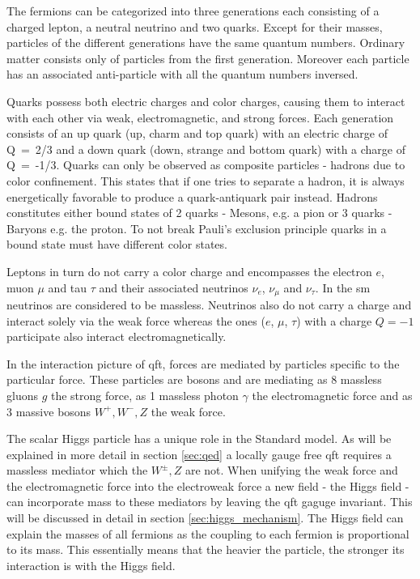 The fermions can be categorized into three generations each consisting of a charged lepton, a neutral neutrino and two quarks. Except for their masses, particles of the different generations have the same quantum numbers. Ordinary matter consists only of particles from the first generation. Moreover each particle has an associated anti-particle with all the quantum numbers inversed.

Quarks possess both electric charges and color charges, causing them to interact with each other via weak, electromagnetic, and strong forces. Each generation consists of an up quark (up, charm and top quark) with an electric charge of \mbox{Q = 2/3} and a down quark (down, strange and bottom quark) with a charge of \mbox{Q = -1/3}. Quarks can only be observed as composite particles - hadrons due to color confinement. This states that if one tries to separate a hadron, it is always energetically favorable to produce a quark-antiquark pair instead. Hadrons constitutes either bound states of 2 quarks - Mesons, e.g. a pion or 3 quarks - Baryons e.g. the proton. To not break Pauli's exclusion principle quarks in a bound state must have different color states.

Leptons in turn do not carry a color charge and encompasses the electron $e$, muon $\mu$ and tau $\tau$ and their associated neutrinos $\nu_e$, $\nu_\mu$ and $\nu_\tau$. In the \ac{sm} neutrinos are considered to be massless. Neutrinos also do not carry a charge and interact solely via the weak force whereas the  ones ($e$, $\mu$, $\tau$) with a charge $Q=-1$ participate also interact electromagnetically.

In the interaction picture of \ac{qft}, forces are mediated by particles specific to the particular force. These particles are bosons and are mediating as 8 massless gluons $g$ the strong force, as 1 massless photon $\gamma$ the electromagnetic force and as 3 massive bosons $W^+,W^-,Z$ the weak force.

The scalar Higgs particle has a unique role in the Standard model. As will be explained in more detail in section \ref{sec:qed} a locally gauge free \ac{qft} requires a massless mediator which the $W^{\pm},Z$ are not. When unifying the weak force and the electromagnetic force into the electroweak force a new field - the Higgs field - can incorporate mass to these mediators by leaving the qft gaguge invariant. This will be discussed in detail in section \ref{sec:higgs_mechanism}. The Higgs field can explain the masses of all fermions as the coupling to each fermion is proportional to its mass. This essentially means that the heavier the particle, the stronger its interaction is with the Higgs field.

